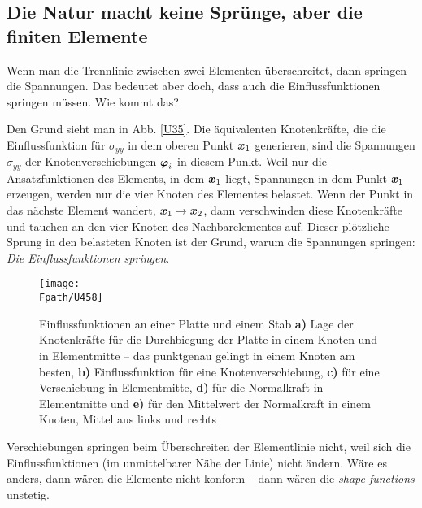\vspace{-1cm}
{\textcolor{sectionTitleBlue}{\section{Die Natur macht keine Spr\"{u}nge, aber die finiten Elemente}}}\label{Jumps}
Wenn man die Trennlinie zwischen zwei Elementen \"{u}berschreitet, dann springen die Spannungen. Das bedeutet aber doch, dass auch die Einflussfunktionen springen m\"{u}ssen. Wie kommt das?

Den Grund sieht man in Abb. \ref{U35}. Die \"{a}quivalenten Knotenkr\"{a}fte, die die Einflussfunktion f\"{u}r $\sigma_{yy}$ in dem oberen Punkt $\mbox{\boldmath $x$}_1$ generieren, sind die Spannungen $\sigma_{yy}$ der Knotenverschiebungen $\mbox{\boldmath $\varphi$}_i$ in diesem Punkt. Weil nur die Ansatzfunktionen des Elements, in dem $\mbox{\boldmath $x$}_1$ liegt, Spannungen in dem Punkt $\mbox{\boldmath $x$}_1$ erzeugen, werden nur die vier Knoten des Elementes belastet. Wenn der Punkt in das n\"{a}chste Element wandert, $\mbox{\boldmath $x$}_1 \to \mbox{\boldmath $x$}_2$, dann verschwinden diese Knotenkr\"{a}fte und tauchen an den vier Knoten des Nachbarelementes auf. Dieser pl\"{o}tzliche Sprung in den belasteten Knoten ist der Grund, warum die Spannungen springen: {\em Die Einflussfunktionen springen\/}.
\begin{figure}
\centering
\if {} \sidecaption \fi
\texttt{[image: \\Fpath/U458]}
\caption{Einflussfunktionen an einer Platte und einem Stab \textbf{ a)} Lage der Knotenkr\"{a}fte f\"{u}r die Durchbiegung der Platte in einem Knoten und in Elementmitte -- das punktgenau gelingt in einem Knoten am besten, \textbf{ b)} Einflussfunktion f\"{u}r eine Knotenverschiebung, \textbf{ c)} f\"{u}r eine Verschiebung in Elementmitte, \textbf{ d)} f\"{u}r die Normalkraft in Elementmitte und \textbf{ e)} f\"{u}r den Mittelwert der Normalkraft in einem Knoten, Mittel aus links und rechts}\label{U458}%
\end{figure}%


Verschiebungen springen beim \"{U}berschreiten der Elementlinie nicht, weil sich die Einflussfunktionen (im unmittelbarer N\"{a}he der Linie) nicht \"{a}ndern. W\"{a}re es anders, dann w\"{a}ren die Elemente nicht konform -- dann w\"{a}ren die {\em shape functions\/} unstetig.

